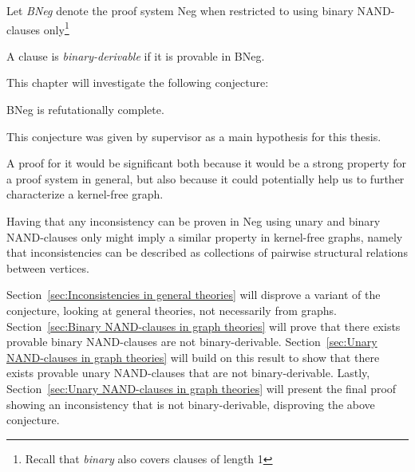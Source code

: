 

\begin{definition}
   Let \textit{BNeg} denote the proof system Neg when restricted to using binary NAND-clauses only\footnote{Recall that \textit{binary} also covers clauses of length 1}
\end{definition}
\begin{definition}
  A clause is \textit{binary-derivable} if it is provable in BNeg.
\end{definition}
This chapter will investigate the following conjecture:
\begin{conjecture}
  BNeg is refutationally complete.
  \label{thm:Neg2_ref_complete}
\end{conjecture}
This conjecture was given by supervisor as a main hypothesis for this thesis.

A proof for it would be significant both because it would be a strong property for a proof system in general, but also because it could potentially help us to further characterize a kernel-free graph.

Having that any inconsistency can be proven in Neg using unary and binary NAND-clauses only might imply a similar property in kernel-free graphs, namely that inconsistencies can be described as collections of pairwise structural relations between vertices.

Section~\ref{sec:Inconsistencies in general theories} will disprove a variant of the conjecture, looking at general theories, not necessarily from graphs.
Section~\ref{sec:Binary NAND-clauses in graph theories} will prove that there exists provable binary NAND-clauses are not binary-derivable.
Section~\ref{sec:Unary NAND-clauses in graph theories} will build on this result to show that there exists provable unary NAND-clauses that are not binary-derivable.
Lastly, Section~\ref{sec:Unary NAND-clauses in graph theories} will present the final proof showing an inconsistency that is not binary-derivable, disproving the above conjecture. 
